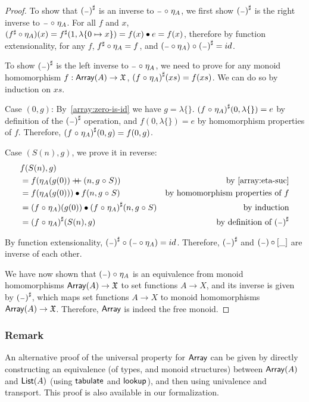 \begin{proof}
    To show that ${({\scriptstyle{-}})}^{\sharp}$ is an inverse to ${\scriptstyle{-}} \mathrel{\circ} \eta_A$,
    we first show ${({\scriptstyle{-}})}^{\sharp}$ is the right inverse to ${\scriptstyle{-}} \mathrel{\circ} \eta_A$.
    For all $f$ and $x$, $({f}^{\sharp} \circ \eta_A)(x) = {f}^{\sharp}(1, \lambda\{0 \mapsto x\}) = f(x) \mathbin{\bullet} e = f(x)$,
    therefore by function extensionality, for any $f$, ${f}^{\sharp} \circ \eta_A = f$,
    and $({\scriptstyle{-}} \circ \eta_A) \mathrel{\circ} {({\scriptstyle{-}})}^{\sharp} = id$.

    To show ${({\scriptstyle{-}})}^{\sharp}$ is the left inverse to ${\scriptstyle{-}} \mathrel{\circ} \eta_A$, we need to prove
    for any monoid homomorphism $f : \operatorname{\mathsf{Array}}(A) \to \mathfrak{X}$, ${(f \mathrel{\circ} \eta_A)}^{\sharp}(xs) = f(xs)$.
    We can do so by induction on $xs$.

    Case $(0, g)$:
    By~\cref{array:zero-is-id} we have $g = \lambda\{\}$.
    ${(f \mathrel{\circ} \eta_A)}^{\sharp}(0, \lambda\{\}) = e$ by definition of the ${({\scriptstyle{-}})}^{\sharp}$ operation,
    and $f(0, \lambda\{\}) = e$ by homomorphism properties of $f$.
    Therefore, ${(f \mathrel{\circ} \eta_A)}^{\sharp}(0, g) = f(0, g)$.

    Case $(S(n), g)$, we prove it in reverse:
    \begin{align*}
         & f(S(n), g)                                                                                                     \\
         & = f(\eta_A(g(0)) \doubleplus (n, g \comp S))                        & \text{by~\cref{array:eta-suc}}            \\
         & = f(\eta_A(g(0))) \mult f(n, g \comp S)                             & \text{by homomorphism properties of $f$} \\
         & = (f \comp \eta_A)(g(0)) \mult \ext{(f \comp \eta_A)}(n, g \comp S) & \text{by induction}                      \\
         & = \ext{(f \comp \eta_A)}(S(n), g)                                   & \text{by definition of $\ext{(\blank)}$}
    \end{align*}

    By function extensionality, ${({\scriptstyle{-}})}^{\sharp} \mathrel{\circ} ({\scriptstyle{-}} \circ \eta_A) = id$.
    Therefore, ${({\scriptstyle{-}})}^{\sharp}$ and $({\scriptstyle{-}}) \circ [\_]$ are inverse of each other.

    We have now shown that $({\scriptstyle{-}}) \mathrel{\circ} \eta_A$ is an equivalence from
    monoid homomorphisms $\operatorname{\mathsf{Array}}(A) \to \mathfrak{X}$
    to set functions $A \to X$, and its inverse is given by ${({\scriptstyle{-}})}^{\sharp}$, which maps set
    functions $A \to X$ to monoid homomorphisms $\operatorname{\mathsf{Array}}(A) \to \mathfrak{X}$. Therefore, $\operatorname{\mathsf{Array}}$ is indeed
    the free monoid.

\end{proof}

\subsubsection*{Remark}
An alternative proof of the universal property for $\operatorname{\mathsf{Array}}$ can be given by directly constructing an equivalence (of
types, and monoid structures) between $\operatorname{\mathsf{Array}}(A)$ and $\operatorname{\mathsf{List}}(A)$ (using $\operatorname{\mathsf{tabulate}}$ and $\operatorname{\mathsf{lookup}}$), and then
using univalence and transport.
%
This proof is also available in our formalization.
